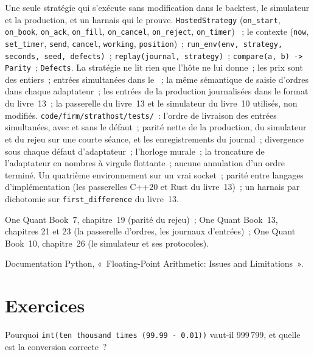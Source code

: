 \begin{build}
 Une seule stratégie qui s'exécute sans modification dans le backtest, le simulateur et la production, et un harnais qui le prouve.
 \texttt{HostedStrategy} (\texttt{on\_start}, \texttt{on\_book}, \texttt{on\_ack}, \texttt{on\_fill},
\texttt{on\_cancel}, \texttt{on\_reject}, \texttt{on\_timer}) ~; le contexte (\texttt{now}, \texttt{set\_timer}, \texttt{send},
\texttt{cancel}, \texttt{working}, \texttt{position})~; \texttt{run\_env(env, strategy, seconds, seed, defects)}~;
\texttt{replay(journal, strategy)}~; \texttt{compare(a, b) -> Parity}~; \texttt{Defects}.
 La stratégie ne lit rien que l'hôte ne lui donne~; les prix sont des entiers~; entrées simultanées dans le ~; la même
sémantique de saisie d'ordres dans chaque adaptateur~; les entrées de la production journalisées dans le format du livre~13~; la passerelle du livre~13 et le simulateur du livre~10 utilisés,
non modifiés.
 \texttt{code/firm/strathost/tests/}~: l'ordre de livraison des entrées simultanées, avec et sans le défaut~; parité
nette de la production, du simulateur et du rejeu sur une courte séance, et les enregistrements du journal~; divergence sous chaque défaut d'adaptateur~; l'horloge
murale~; la troncature de l'adaptateur en nombres à virgule flottante~; aucune annulation d'un ordre terminé.
 Un quatrième environnement sur un vrai socket~; parité entre langages d'implémentation (les passerelles C++20 et Rust du livre~13)~; un
harnais par dichotomie sur \texttt{first\_difference} du livre~13.
\end{build}

\begin{omsources}
\item One Quant Book~7, chapitre~19 (parité du rejeu)~; One Quant Book~13, chapitres 21 et 23 (la passerelle d'ordres, les journaux d'entrées)~; One Quant
Book~10, chapitre~26 (le simulateur et ses protocoles).
\item Documentation Python, «~Floating-Point Arithmetic: Issues and Limitations~».
\end{omsources}

\section{Exercices}

\begin{exercise}[$\star$]\label{exo:pl:simulation-production-parity:1}
Pourquoi \texttt{int(ten thousand times (99.99 - 0.01))} vaut-il 999\,799, et quelle est la conversion correcte~?
\end{exercise}

